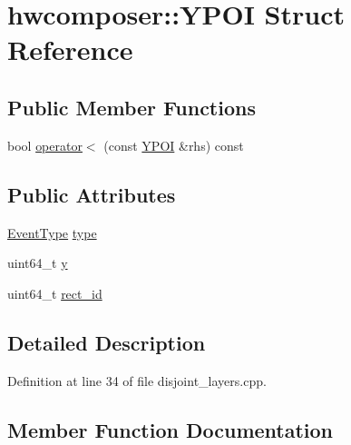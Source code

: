 \hypertarget{structhwcomposer_1_1YPOI}{}\section{hwcomposer\+:\+:Y\+P\+OI Struct Reference}
\label{structhwcomposer_1_1YPOI}
\subsection*{Public Member Functions}
\begin{DoxyCompactItemize}
\item 
bool \mbox{\hyperlink{structhwcomposer_1_1YPOI_a0ff02abf045ae63e8189aa929124da87}{operator$<$}} (const \mbox{\hyperlink{structhwcomposer_1_1YPOI}{Y\+P\+OI}} \&rhs) const
\end{DoxyCompactItemize}
\subsection*{Public Attributes}
\begin{DoxyCompactItemize}
\item 
\mbox{\hyperlink{namespacehwcomposer_a4600de8fd807f9d693b865758557d612}{Event\+Type}} \mbox{\hyperlink{structhwcomposer_1_1YPOI_a2bfd8b89315b003525573218bc070126}{type}}
\item 
uint64\+\_\+t \mbox{\hyperlink{structhwcomposer_1_1YPOI_a0a1025b2b6f048c7d8c6ff1571de8ad2}{y}}
\item 
uint64\+\_\+t \mbox{\hyperlink{structhwcomposer_1_1YPOI_a7013c2713330905fb2fe5027f43fc645}{rect\+\_\+id}}
\end{DoxyCompactItemize}


\subsection{Detailed Description}


Definition at line 34 of file disjoint\+\_\+layers.\+cpp.



\subsection{Member Function Documentation}
\mbox{\label{structhwcomposer_1_1YPOI_a0ff02abf045ae63e8189aa929124da87}} 
